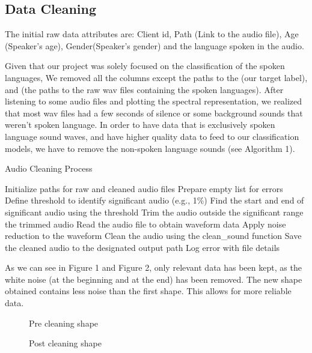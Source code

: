 \documentclass[twocolumn]{article}
\begin{document}
\subsection{Data Cleaning}
\label{3.2}
The initial raw data attributes are: Client id, Path (Link to the audio file), Age (Speaker's age), Gender(Speaker's gender) and the language spoken in the audio.

Given that our project was solely focused on the classification of the spoken languages, We removed all the columns except the paths to the  (our target label), and  (the paths to the raw wav files containing the spoken languages). After listening to some audio files and plotting the spectral representation, we realized that most wav files had a few seconds of silence or some background sounds that weren't spoken language. In order to have data that is exclusively spoken language sound waves, and have higher quality data to feed to our classification models, we have to remove the non-spoken language sounds (see Algorithm 1).
\begin{algorithm}
\caption{Audio Cleaning Process}
\label{algo1}
\begin{algorithmic}[1]
\State Initialize paths for raw and cleaned audio files
\State Prepare empty list for errors
    \State Define threshold to identify significant audio (e.g., 1\%)
    \State Find the start and end of significant audio using the threshold
    \State Trim the audio outside the significant range
    \State \Return the trimmed audio
\EndFunction
{}
        \State Read the audio file to obtain waveform data
        \State Apply noise reduction to the waveform
            \State Clean the audio using the clean\_sound function
            \State Save the cleaned audio to the designated output path
            \State Log error with file details
        \EndIf
\EndFor
\end{algorithmic}
\end{algorithm}

As we can see in Figure 1 and Figure 2, only relevant data has been kept, as the white noise (at the beginning and at the end) has been removed. The new shape obtained contains less noise than the first shape. This allows for more reliable data.\\
\begin{figure}[!tbp]
  \centering
  \begin{minipage}[b]{0.4\textwidth}
    
    \caption{Pre cleaning shape}
  \end{minipage}
  \hfill
  \begin{minipage}[b]{0.4\textwidth}
    
    \caption{Post cleaning shape}
  \end{minipage}
\end{figure}
\end{document}

